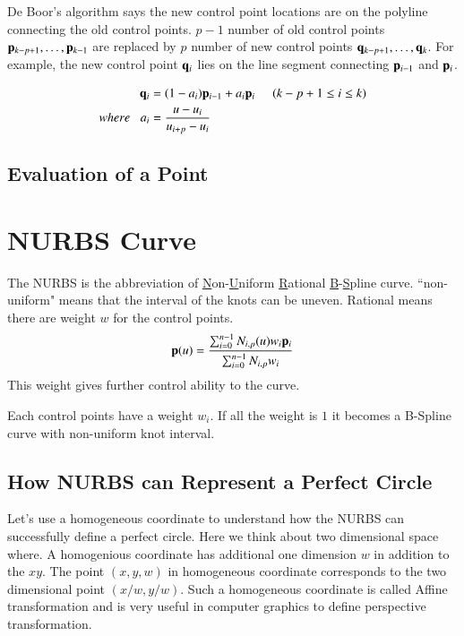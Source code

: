 De Boor's algorithm says the new control point locations are on the polyline connecting the old control points.
%
$p-1$ number of old control points $\mathbf{p}_{k-p+1},\ldots,\mathbf{p}_{k-1}$ are replaced by $p$ number of new control points $\mathbf{q}_{k-p+1},\ldots,\mathbf{q}_k$.
%
For example, the new control point $\mathbf{q}_i$ lies on the line segment connecting $\mathbf{p}_{i-1}$ and $\mathbf{p}_i$.  

\begin{align}
\mathbf{q}_i &= (1-a_i) \mathbf{p}_{i-1} + a_i\mathbf{p}_i\;\;\;\;  \; (k-p+1 \le i \le k) \\
where \;\;\; a_i      &=  \frac{u-u_i}{u_{i+p}-u_i} 
\end{align}



\subsection{Evaluation of a Point}




\section{NURBS Curve}
%
The NURBS is the abbreviation of \underline{N}on-\underline{U}niform \underline{R}ational \underline{B}-\underline{S}pline curve. 
%
``non-uniform" means that the interval of the knots can be uneven. 
%
Rational means there are weight $w$ for the control points.
%
\begin{equation}
\mathbf{p}(u) = \frac{\sum_{i=0}^{n-1} N_{i,p}(u)w_i\mathbf{p}_i}{\sum_{i=0}^{n-1} N_{i,p}w_i }
\end{equation}
%
This weight gives further control ability to the curve. 


Each control points have a weight $w_i$. 
%
If all the weight is $1$ it becomes a B-Spline curve with non-uniform knot interval.
%






\subsection{How NURBS can Represent a Perfect Circle}


Let's use a homogeneous coordinate to understand how the NURBS can successfully define a perfect circle. 
%
Here we think about two dimensional space where.
%
A homogenious coordinate has additional one dimension $w$ in addition to the $xy$.
%
The point $(x,y,w)$ in homogeneous coordinate corresponds to the two dimensional point $(x/w,y/w)$.
%
Such a homogeneous coordinate is called Affine transformation and is very useful in computer graphics to define perspective transformation.
%


